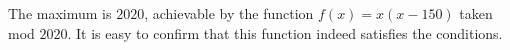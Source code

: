 The maximum is $2020$, achievable by the function $f(x)=x(x-150)$ taken mod $2020$. It is easy to confirm that this function indeed satisfies the conditions.